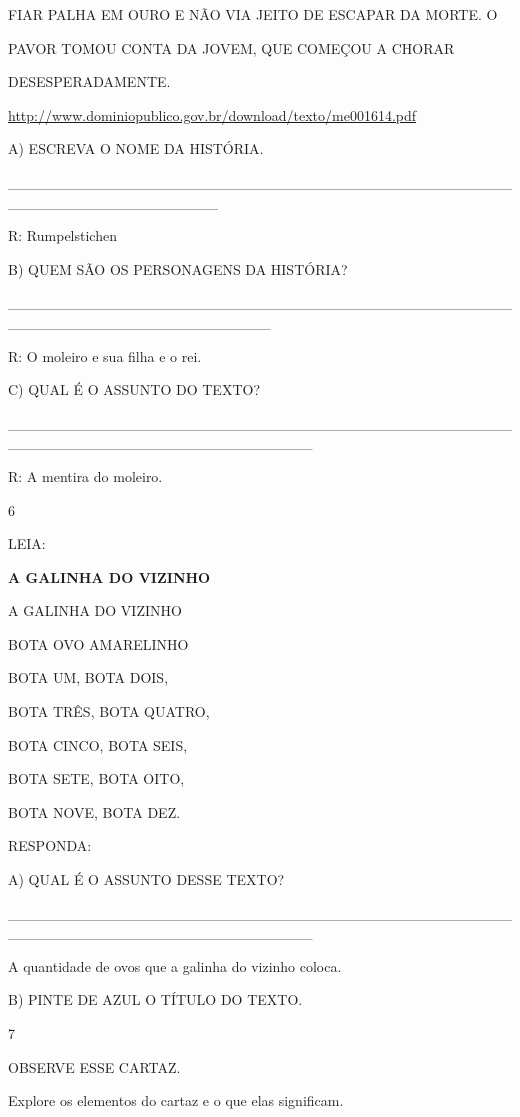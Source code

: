 {{{{{FIAR PALHA EM OURO E NÃO VIA JEITO DE ESCAPAR DA MORTE. O

PAVOR TOMOU CONTA DA JOVEM, QUE COMEÇOU A CHORAR

DESESPERADAMENTE.

\url{http://www.dominiopublico.gov.br/download/texto/me001614.pdf}

A) ESCREVA O NOME DA HISTÓRIA.

\_\_\_\_\_\_\_\_\_\_\_\_\_\_\_\_\_\_\_\_\_\_\_\_\_\_\_\_\_\_\_\_\_\_\_\_\_\_\_\_\_\_\_\_\_\_\_\_\_\_\_\_\_\_\_\_\_\_\_\_\_\_\_\_\_\_\_\_

R: Rumpelstichen

B) QUEM SÃO OS PERSONAGENS DA HISTÓRIA?

\_\_\_\_\_\_\_\_\_\_\_\_\_\_\_\_\_\_\_\_\_\_\_\_\_\_\_\_\_\_\_\_\_\_\_\_\_\_\_\_\_\_\_\_\_\_\_\_\_\_\_\_\_\_\_\_\_\_\_\_\_\_\_\_\_\_\_\_\_\_\_\_\_

R: O moleiro e sua filha e o rei.

C) QUAL É O ASSUNTO DO TEXTO?

\_\_\_\_\_\_\_\_\_\_\_\_\_\_\_\_\_\_\_\_\_\_\_\_\_\_\_\_\_\_\_\_\_\_\_\_\_\_\_\_\_\_\_\_\_\_\_\_\_\_\_\_\_\_\_\_\_\_\_\_\_\_\_\_\_\_\_\_\_\_\_\_\_\_\_\_\_

R: A mentira do moleiro.

\num{6}

LEIA:

\textbf{A GALINHA DO VIZINHO}

A GALINHA DO VIZINHO

BOTA OVO AMARELINHO

BOTA UM, BOTA DOIS,

BOTA TRÊS, BOTA QUATRO,

BOTA CINCO, BOTA SEIS,

BOTA SETE, BOTA OITO,

BOTA NOVE, BOTA DEZ.

RESPONDA:

A) QUAL É O ASSUNTO DESSE TEXTO?

\_\_\_\_\_\_\_\_\_\_\_\_\_\_\_\_\_\_\_\_\_\_\_\_\_\_\_\_\_\_\_\_\_\_\_\_\_\_\_\_\_\_\_\_\_\_\_\_\_\_\_\_\_\_\_\_\_\_\_\_\_\_\_\_\_\_\_\_\_\_\_\_\_\_\_\_\_

A quantidade de ovos que a galinha do vizinho coloca.

B) PINTE DE AZUL O TÍTULO DO TEXTO.

\num{7}

OBSERVE ESSE CARTAZ.

Explore os elementos do cartaz e o que elas significam.

}}}}}
